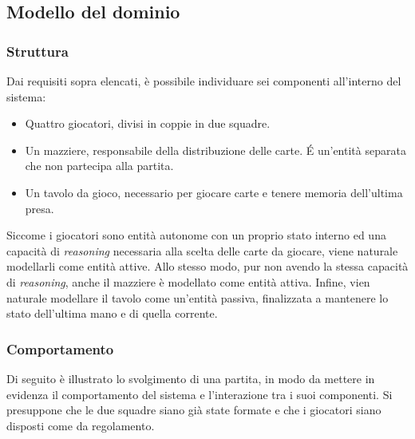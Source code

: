 \documentclass[a4paper,12pt]{article}
\begin{document}
\subsection{Modello del dominio} \label{domain-model}

\subsubsection{Struttura}

Dai requisiti sopra elencati, è possibile individuare sei componenti all'interno del sistema:
\begin{itemize}
	\item Quattro giocatori, divisi in coppie in due squadre.
	\item Un mazziere, responsabile della distribuzione delle carte. \'E un'entità separata che non partecipa alla partita.
	\item Un tavolo da gioco, necessario per giocare carte e tenere memoria dell'ultima presa. 
\end{itemize}

Siccome i giocatori sono entità autonome con un proprio stato interno ed una capacità di \emph{reasoning} necessaria alla scelta delle carte da giocare, viene naturale modellarli come entità attive. Allo stesso modo, pur non avendo la stessa capacità di \emph{reasoning}, anche il mazziere è modellato come entità attiva. Infine, vien naturale modellare il tavolo come un'entità passiva, finalizzata a mantenere lo stato dell'ultima mano e di quella corrente. 

\subsubsection{Comportamento}

Di seguito è illustrato lo svolgimento di una partita, in modo da mettere in evidenza il comportamento del sistema e l'interazione tra i suoi componenti. Si presuppone che le due squadre siano già state formate e che i giocatori siano disposti come da regolamento.
\end{document}
